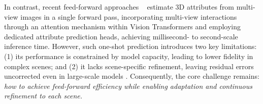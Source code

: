 

In contrast, recent feed-forward approaches ~\cite{wang2024dust3r,leroy2024grounding,yang2025fast3r,wang2025vggt} estimate 3D attributes from multi-view images in a single forward pass, incorporating multi-view interactions through an attention mechanism within Vision Transformers and employing dedicated attribute prediction heads, achieving millisecond- to second-scale inference time.
However, such one-shot prediction introduces two key limitations:
(1) its performance is constrained by model capacity, leading to lower fidelity in complex scenes; and
(2) it lacks scene-specific refinement, leaving residual errors uncorrected even in large-scale models \cite{wang2025vggt}.
Consequently, the core challenge remains: \emph{how to achieve feed-forward efficiency while enabling adaptation and continuous refinement to each scene.}%

